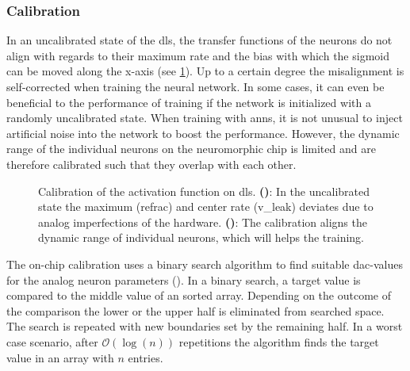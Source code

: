 \subsubsection*{Calibration}\label{calibration}
In an uncalibrated state of the \gls{dls}, the transfer functions of the neurons do not align with regards to their maximum rate and the bias with which the sigmoid can be moved along the x-axis (see \cref{transferfunction_wout_calib}). Up to a certain degree the misalignment is self-corrected when training the neural network. In some cases, it can even be beneficial to the performance of training if the network is initialized with a randomly uncalibrated state. When training with \glspl{ann}, it is not unusual to inject artificial noise into the network to boost the performance. However, the dynamic range of the individual neurons on the neuromorphic chip is limited and are therefore calibrated such that they overlap with each other.

\begin{figure}
	\centering
	\begin{subfigure}[b]{0.49\textwidth}
		\caption{}
		
		\label{transferfunction_wout_calib}
	\end{subfigure}
	\begin{subfigure}[b]{0.49\textwidth}		
		\caption{}
		
		\label{transferfunction_w_calib}
	\end{subfigure}
	\caption[Calibration of the sigmoid activation function on \acrshort{dls}.]{Calibration of the activation function on \acrshort{dls}. \textbf{()}: In the uncalibrated state the maximum (\gls{refrac}) and center rate (\gls{v_leak}) deviates due to analog imperfections of the hardware. \textbf{()}: The calibration aligns the dynamic range of individual neurons, which will helps the training.}
\end{figure}

The on-chip calibration uses a binary search algorithm to find suitable \gls{dac}-values for the analog neuron parameters (\citealp{binarysearchsource}). In a binary search, a target value is compared to the middle value of an sorted array. Depending on the outcome of the comparison the lower or the upper half is eliminated from searched space. The search is repeated with new boundaries set by the remaining half. In a worst case scenario, after $\mathcal{O}(\log(n))$ repetitions the algorithm finds the target value in an array with $n$ entries.

